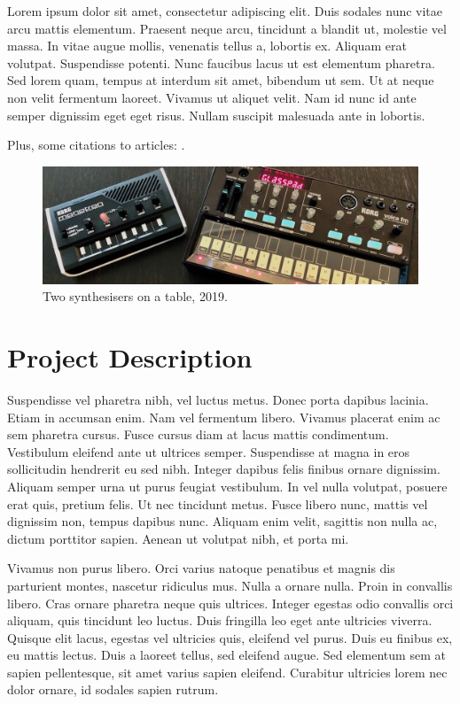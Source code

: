 \documentclass[acmsmall]{nimeart}
\begin{document}
Lorem ipsum dolor sit amet, consectetur adipiscing elit. Duis sodales nunc vitae arcu mattis elementum. Praesent neque arcu, tincidunt a blandit ut, molestie vel massa. In vitae augue mollis, venenatis tellus a, lobortis ex. Aliquam erat volutpat. Suspendisse potenti. Nunc faucibus lacus ut est elementum pharetra. Sed lorem quam, tempus at interdum sit amet, bibendum ut sem. Ut at neque non velit fermentum laoreet. Vivamus ut aliquet velit. Nam id nunc id ante semper dignissim eget eget risus. Nullam suscipit malesuada ante in lobortis.

Plus, some citations to articles: \cite{doe2023,
wizard2022, alien2024}.

\begin{figure}[h]
  \centering
  \includegraphics[width=\linewidth]{images/sampleteaser.pdf}
  \caption{Two synthesisers on a table, 2019.}
\end{figure}

\section{Project Description}

Suspendisse vel pharetra nibh, vel luctus metus. Donec porta dapibus lacinia. Etiam in accumsan enim. Nam vel fermentum libero. Vivamus placerat enim ac sem pharetra cursus. Fusce cursus diam at lacus mattis condimentum. Vestibulum eleifend ante ut ultrices semper. Suspendisse at magna in eros sollicitudin hendrerit eu sed nibh. Integer dapibus felis finibus ornare dignissim. Aliquam semper urna ut purus feugiat vestibulum. In vel nulla volutpat, posuere erat quis, pretium felis. Ut nec tincidunt metus. Fusce libero nunc, mattis vel dignissim non, tempus dapibus nunc. Aliquam enim velit, sagittis non nulla ac, dictum porttitor sapien. Aenean ut volutpat nibh, et porta mi.

Vivamus non purus libero. Orci varius natoque penatibus et magnis dis parturient montes, nascetur ridiculus mus. Nulla a ornare nulla. Proin in convallis libero. Cras ornare pharetra neque quis ultrices. Integer egestas odio convallis orci aliquam, quis tincidunt leo luctus. Duis fringilla leo eget ante ultricies viverra. Quisque elit lacus, egestas vel ultricies quis, eleifend vel purus. Duis eu finibus ex, eu mattis lectus. Duis a laoreet tellus, sed eleifend augue. Sed elementum sem at sapien pellentesque, sit amet varius sapien eleifend. Curabitur ultricies lorem nec dolor ornare, id sodales sapien rutrum.
\end{document}
